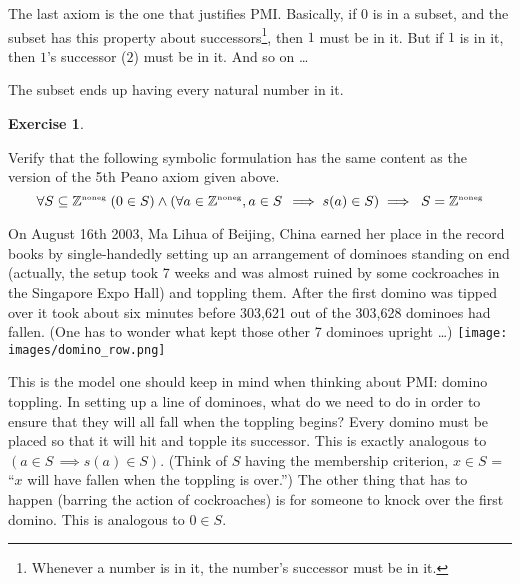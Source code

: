 \documentclass[10pt,]{book}
\theoremstyle{plain}
\theoremstyle{definition}
\theoremstyle{definition}
\newtheorem{exercise}[theorem]{Exercise}
\numberwithin{equation}{section}
\renewcommand{\Naturals}{{\mathbb Z}^{\mbox{\tiny noneg}} }
\newcommand{\Naturals}{{\mathbb N}}
\begin{document}
\par

    The last axiom is the one that justifies PMI. Basically, if \(0\) is in
    a subset, and the subset has this property about successors\footnote{Whenever a number is in it, the number's successor must be in it.\label{fn-30}}, then \(1\) must
    be in it. But if \(1\) is in it, then \(1\)'s successor (\(2\)) must be in it.
    And so on \dots{}
\par

    The subset ends up having every natural number in it.
\begin{exercise}\label{exercise-42}

        Verify that the following symbolic formulation has the same content
        as the version of the 5th Peano axiom given above.
        \begin{equation*}
          \forall S \subseteq \Naturals \; ( 0 \in S ) \land (\forall a \in \Naturals, a \in S \, \implies s(a) \in S) \implies  \; S=\Naturals
        \end{equation*}
\end{exercise}
\par

    On August 16th 2003, Ma Lihua of Beijing, China earned her place in the
    record books by single-handedly setting up an arrangement of dominoes
    standing on end (actually, the setup took 7 weeks and was almost ruined by
    some cockroaches in the Singapore Expo Hall) and toppling them.
    After the first domino was tipped over it took about six minutes
    before 303,621 out of the 303,628 dominoes had fallen. (One has to wonder
    what kept those other 7 dominoes upright \dots{})
\texttt{[image: images/domino\_row.png]}
\par

    This is the model one should keep in mind when thinking about PMI: domino
    toppling. In setting up a line of dominoes, what do we need to do
    in order to ensure that they will all fall when the toppling begins?
    Every domino must be placed so that it will hit and topple its successor.
    This is exactly analogous to \((a \in S \, \implies s(a) \in S)\). (Think
    of \(S\) having the membership criterion, \(x \in S\) = ``\(x\) will have fallen
    when the toppling is over.'') The other thing that has to happen
    (barring the action of cockroaches) is for someone to knock over the
    first domino. This is analogous to \(0 \in S\).
\par
\end{document}
